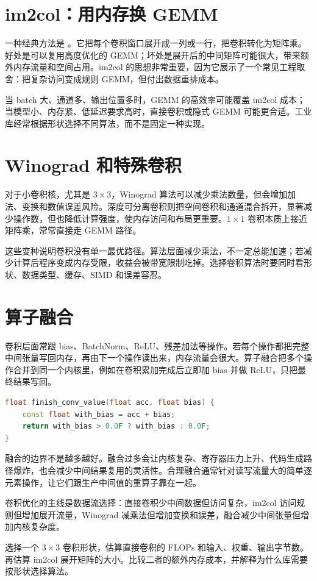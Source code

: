 \section{im2col：用内存换 GEMM}

一种经典方法是 。它把每个卷积窗口展开成一列或一行，把卷积转化为矩阵乘。好处是可以复用高度优化的 GEMM；坏处是展开后的中间矩阵可能很大，带来额外内存流量和空间占用。im2col 的思想非常重要，因为它展示了一个常见工程取舍：把复杂访问变成规则 GEMM，但付出数据重排成本。

当 batch 大、通道多、输出位置多时，GEMM 的高效率可能覆盖 im2col 成本；当模型小、内存紧、低延迟要求高时，直接卷积或隐式 GEMM 可能更合适。工业库经常根据形状选择不同算法，而不是固定一种实现。

\section{Winograd 和特殊卷积}

对于小卷积核，尤其是 $3 \times 3$，Winograd 算法可以减少乘法数量，但会增加加法、变换和数值误差风险。深度可分离卷积则把空间卷积和通道混合拆开，显著减少操作数，但也降低计算强度，使内存访问和布局更重要。$1 \times 1$ 卷积本质上接近矩阵乘，常常直接走 GEMM 路径。

这些变种说明卷积没有单一最优路径。算法层面减少乘法，不一定总能加速；若减少计算后程序变成内存受限，收益会被带宽限制吃掉。选择卷积算法时要同时看形状、数据类型、缓存、SIMD 和误差容忍。

\section{算子融合}

卷积后面常跟 bias、BatchNorm、ReLU、残差加法等操作。若每个操作都把完整中间张量写回内存，再由下一个操作读出来，内存流量会很大。算子融合把多个操作合并到同一个内核里，例如在卷积累加完成后立即加 bias 并做 ReLU，只把最终结果写回。

\begin{lstlisting}[language=C++,caption={卷积输出阶段融合 bias 和 ReLU 的形状}]
float finish_conv_value(float acc, float bias) {
    const float with_bias = acc + bias;
    return with_bias > 0.0F ? with_bias : 0.0F;
}
\end{lstlisting}

融合的边界不是越多越好。融合过多会让内核复杂、寄存器压力上升、代码生成路径爆炸，也会减少中间结果复用的灵活性。合理融合通常针对读写流量大的简单逐元素操作，让它们跟生产中间值的重算子靠在一起。

\begin{keyidea}
卷积优化的主线是数据流选择：直接卷积少中间数据但访问复杂，im2col 访问规则但增加展开流量，Winograd 减乘法但增加变换和误差，融合减少中间张量但增加内核复杂度。
\end{keyidea}

\begin{exercisebox}
选择一个 $3 \times 3$ 卷积形状，估算直接卷积的 FLOPs 和输入、权重、输出字节数。再估算 im2col 展开矩阵的大小。比较二者的额外内存成本，并解释为什么库需要按形状选择算法。
\end{exercisebox}
